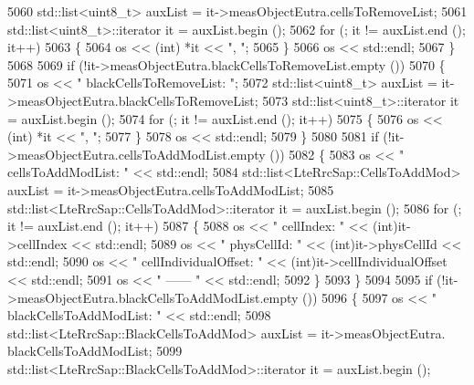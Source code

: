 \begin{DoxyCode}
5060                   std::list<uint8\_t> auxList = it->measObjectEutra.cellsToRemoveList;
5061                   std::list<uint8\_t>::iterator it = auxList.begin ();
5062                   \textcolor{keywordflow}{for} (; it != auxList.end (); it++)
5063                     \{
5064                       os << (int) *it << \textcolor{stringliteral}{", "};
5065                     \}
5066                   os << std::endl;
5067                 \}
5068 
5069               \textcolor{keywordflow}{if} (!it->measObjectEutra.blackCellsToRemoveList.empty ())
5070                 \{
5071                   os << \textcolor{stringliteral}{"    blackCellsToRemoveList: "};
5072                   std::list<uint8\_t> auxList = it->measObjectEutra.blackCellsToRemoveList;
5073                   std::list<uint8\_t>::iterator it = auxList.begin ();
5074                   \textcolor{keywordflow}{for} (; it != auxList.end (); it++)
5075                     \{
5076                       os << (int) *it << \textcolor{stringliteral}{", "};
5077                     \}
5078                   os << std::endl;
5079                 \}
5080 
5081               \textcolor{keywordflow}{if} (!it->measObjectEutra.cellsToAddModList.empty ())
5082                 \{
5083                   os << \textcolor{stringliteral}{"    cellsToAddModList: "} << std::endl;
5084                   std::list<LteRrcSap::CellsToAddMod> auxList = it->measObjectEutra.cellsToAddModList;
5085                   std::list<LteRrcSap::CellsToAddMod>::iterator it = auxList.begin ();
5086                   \textcolor{keywordflow}{for} (; it != auxList.end (); it++)
5087                     \{
5088                       os << \textcolor{stringliteral}{"      cellIndex: "} <<  (int)it->cellIndex << std::endl;
5089                       os << \textcolor{stringliteral}{"      physCellId: "} <<  (\textcolor{keywordtype}{int})it->physCellId  << std::endl;
5090                       os << \textcolor{stringliteral}{"      cellIndividualOffset: "} <<  (int)it->cellIndividualOffset << std::endl;
5091                       os << \textcolor{stringliteral}{"      ------ "} << std::endl;
5092                     \}
5093                 \}
5094 
5095               \textcolor{keywordflow}{if} (!it->measObjectEutra.blackCellsToAddModList.empty ())
5096                 \{
5097                   os << \textcolor{stringliteral}{"    blackCellsToAddModList: "} << std::endl;
5098                   std::list<LteRrcSap::BlackCellsToAddMod> auxList = it->measObjectEutra.
      blackCellsToAddModList;
5099                   std::list<LteRrcSap::BlackCellsToAddMod>::iterator it = auxList.begin ();

\end{DoxyCode}
